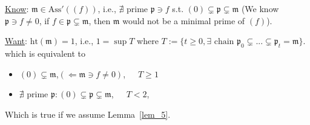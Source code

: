 \documentclass[11pt]{article}
\newcommand{\scm}{{\mathfrak m}}
\newcommand{\scp}{{\mathfrak p}}
\newcommand{\Llta}{\Longleftarrow}
\begin{document}
\underline{Know}: $\scm\in \text{Ass}'((f))$, i.e., $\nexists \text{ prime }\scp\ni f$ s.t. $(0)\subsetneq \scp\subsetneq \scm$ (We know $\scp\ni f\neq 0$, if $f\in\scp\subsetneq\scm$, then $\scm$ would not be a minimal prime of $(f)$).

\underline{Want}: $\text{ht}(\scm)=1$, i.e.,
$1=\sup T$ where $T:=\{t\geq 0,\exists \text{ chain } \scp_0\subsetneq ...\subsetneq \scp_t=\scm\}$. which is equivalent to 
\begin{itemize}
\item $(0)\subsetneq \scm$,$(\Llta \scm\ni f\neq 0)$,\ \ \  $T\geq 1$
\item $\nexists$ prime $\scp:(0)\subsetneq \scp\subsetneq\scm$,\ \ \ $T< 2$,
\end{itemize}
Which is true if we assume Lemma~\ref{lem_5}.  
\end{document}
